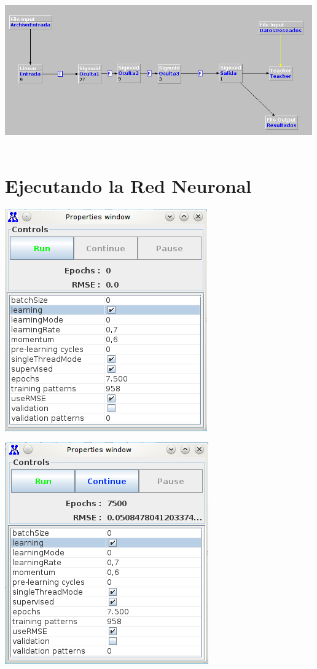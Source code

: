 \documentclass[12pt,titlepage]{article}
\begin{document}
\begin{center}
 \includegraphics[width=500,height=250]{./Images/RN.png}
\end{center}

\section{Ejecutando la Red Neuronal}
\begin{center}
 \includegraphics{./Images/configuracion-corridas.png}
\end{center}

\begin{center}
 \includegraphics{./Images/fin-corridas.png}
\end{center}
\end{document}
